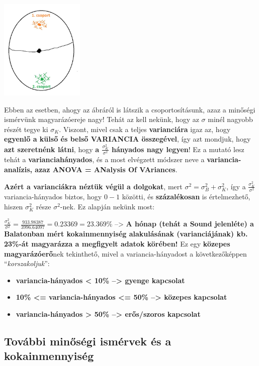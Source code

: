 \documentclass[
]{book}
\providecommand{\tightlist}{%
  \setlength{\itemsep}{0pt}\setlength{\parskip}{0pt}}
\begin{document}
\includegraphics[width=0.3\textwidth,height=\textheight]{varhanyad2.jpg}

Ebben az esetben, ahogy az ábráról is látszik a csoportosításunk, azaz a minőségi ismérvünk magyarázóereje nagy! Tehát az kell nekünk, hogy az \(\sigma\) minél nagyobb részét tegye ki \(\sigma_K\). Viszont, mivel csak a teljes \textbf{varianciára} igaz az, hogy \textbf{egyenlő a külső és belső VARIANCIA összegével}, így azt mondjuk, hogy \textbf{azt szeretnénk látni}, hogy \textbf{a \(\frac{\sigma_K^2}{\sigma^2}\) hányados nagy legyen}! Ez a mutató lesz tehát a \textbf{varianciahányados}, és a most elvégzett módszer neve a \textbf{variancia-analízis, azaz ANOVA = ANalysis Of VAriances}.

\textbf{Azért a varianciákra néztük végül a dolgokat}, mert \(\sigma^2=\sigma_B^2+\sigma_K^2\), így a \(\frac{\sigma_K^2}{\sigma^2}\) variancia-hányados biztos, hogy \(0-1\) közötti, és \textbf{százalékosan} is értelmezhető, hiszen \(\sigma_K^2\) része \(\sigma^2\)-nek. Ez alapján nekünk most:

\(\frac{\sigma_K^2}{\sigma^2} = \frac{933.98387}{3996.64097}=0.23369=23.369\%\) --\textgreater{} \textbf{A hónap (tehát a Sound jelenléte) a Balatonban mért kokainmennyiség alakulásának (varianciájának) kb. 23\%-át magyarázza a megfigyelt adatok körében!} Ez egy \textbf{közepes magyarázóerő}nek tekinthető, mivel a variancia-hányadost a következőképpen ``\emph{korszakoljuk}'':

\begin{itemize}
\tightlist
\item
  \textbf{variancia-hányados \textless{} 10\% --\textgreater{} gyenge kapcsolat}
\item
  \textbf{10\% \textless= variancia-hányados \textless= 50\% --\textgreater{} közepes kapcsolat}
\item
  \textbf{variancia-hányados \textgreater{} 50\% --\textgreater{} erős/szoros kapcsolat}
\end{itemize}

\subsection{További minőségi ismérvek és a kokainmennyiség}\label{tovuxe1bbi-minux151suxe9gi-ismuxe9rvek-uxe9s-a-kokainmennyisuxe9g}
\end{document}
